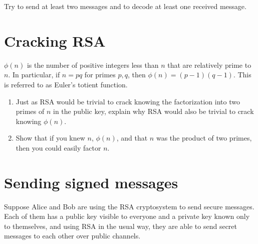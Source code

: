 \documentclass[12pt]{article}
\begin{document}
Try to send at least two messages and to decode at least one received message.


\newpage
\section{Cracking RSA}

$\phi(n)$ is the number of positive integers less than $n$ that are relatively prime to $n$.  In particular, if $n = pq$ for primes $p, q$, then $\phi(n) = (p-1)(q-1)$. This is referred to as Euler's totient function.

\begin{enumerate}[label=\textbf{(\alph*)}]
\item Just as RSA would be trivial to crack knowing the factorization
into two primes of $n$ in the public key, explain why RSA would also
be trivial to crack knowing $\phi(n)$.


\item Show that if you knew $n$, $\phi(n)$, and that $n$ was the
product of two primes, then you could easily factor $n$.


\end{enumerate}

\newpage
\section{Sending signed messages}

Suppose Alice and Bob are using the RSA cryptosystem to send secure
messages.  Each of them has a public key visible to everyone and a
private key known only to themselves, and using RSA in the usual way,
they are able to send secret messages to each other over public
channels.
\end{document}

